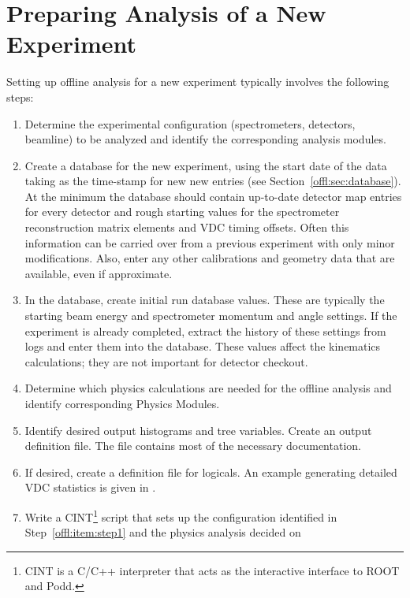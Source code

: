 {\section{Preparing Analysis of a New Experiment}
\label{offl:sec:newexpt}
Setting up offline analysis for a new experiment typically 
involves the following steps:
\begin{enumerate}
  \item Determine the experimental configuration (spectrometers,
        detectors, beamline) to be analyzed and identify the corresponding 
	analysis modules. \label{offl:item:step1}
  \item Create a database for the new experiment, using the
        start date of the data taking as the time-stamp for new
	new entries (see Section~\ref{offl:sec:database}).
	At the minimum the database should contain up-to-date
	detector map entries for every detector and rough starting
	values for the spectrometer reconstruction matrix elements
	and VDC timing offsets. Often this information can be
	carried over from a previous experiment with only minor
	modifications. Also, enter any other calibrations and geometry
	data that are available, even if approximate.
  \item In the database, create initial run database values.
        These are typically the starting beam energy and spectrometer
	momentum and angle settings. If the experiment is already completed,
	extract the history of these settings from logs and enter them
	into the database. These values affect the kinematics calculations;
	they are not important for detector checkout.
  \item Determine which physics calculations are needed for the
        offline analysis and identify corresponding Physics Modules.
	\label{offl:item:step3}
  \item Identify desired output histograms and tree variables.
        Create an output definition file. The file 
         contains
	most of the necessary documentation.
  \item If desired, create a definition file for logicals.
        An example generating detailed VDC statistics is
	given in .
  \item Write a CINT\footnote{CINT is a C/C++ interpreter that acts
        as the interactive interface to ROOT and Podd.}
        script that sets up the configuration identified in 
	Step~\ref{offl:item:step1} and the physics analysis decided on

\end{enumerate}}
